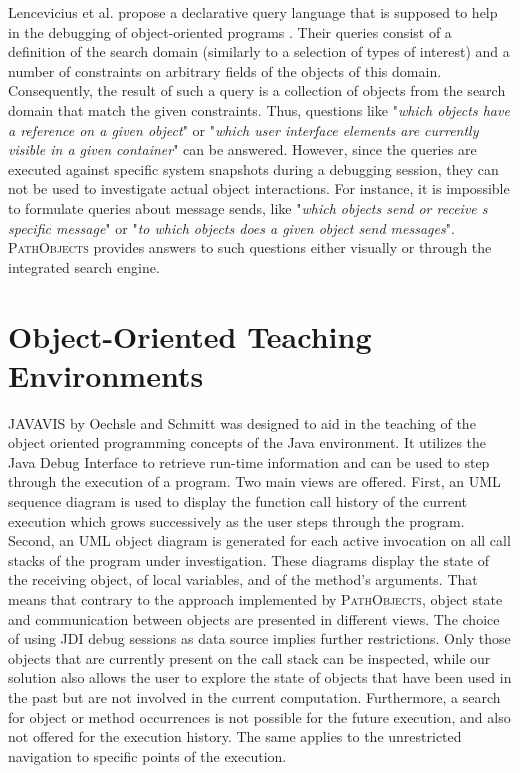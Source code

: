 Lencevicius et al. propose a declarative query language that is supposed to help in the debugging of object-oriented programs \cite{lencevicius_query-based_1997, guerraoui_dynamic_1999}.
Their queries consist of a definition of the search domain (similarly to a selection of types of interest) and a number of constraints on arbitrary fields of the objects of this domain.
Consequently, the result of such a query is a collection of objects from the search domain that match the given constraints.
Thus, questions like "\textit{which objects have a reference on a given object}" or "\textit{which user interface elements are currently visible in a given container}" can be answered.
However, since the queries are executed against specific system snapshots during a debugging session, they can not be used to investigate actual object interactions.
For instance, it is impossible to formulate queries about message sends, like "\textit{which objects send or receive s specific message}" or "\textit{to which objects does a given object send messages}".
\textsc{PathObjects} provides answers to such questions either visually or through the integrated search engine.

\section{Object-Oriented Teaching Environments}

\textsc{JAVAVIS} by Oechsle and Schmitt \cite{diehl_javavis:_2002} was designed to aid in the teaching of the object oriented programming concepts of the Java environment.
It utilizes the Java Debug Interface to retrieve run-time information and can be used to step through the execution of a program.
Two main views are offered.
First, an UML sequence diagram is used to display the function call history of the current execution which grows successively as the user steps through the program.
Second, an UML object diagram is generated for each active invocation on all call stacks of the program under investigation.
These diagrams display the state of the receiving object, of local variables, and of the method's arguments.
That means that contrary to the approach implemented by \textsc{PathObjects}, object state and communication between objects are presented in different views.
The choice of using JDI debug sessions as data source implies further restrictions.
Only those objects that are currently present on the call stack can be inspected, while our solution also allows the user to explore the state of objects that have been used in the past but are not involved in the current computation.
Furthermore, a search for object or method occurrences is not possible for the future execution, and also not offered for the execution history.
The same applies to the unrestricted navigation to specific points of the execution.

